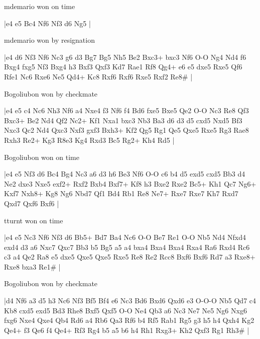 mdemario won on time

\makegametitle
|e4 e5 Bc4 Nf6 Nf3 d6 Ng5  |

\showboard

mdemario won by resignation

\makegametitle
|e4 d6 Nf3 Nf6 Nc3 g6 d3 Bg7 Bg5 Nh5 Be2 Bxc3+ bxc3 Nf6 O-O Ng4 Nd4 f6 Bxg4 fxg5 Nf3 Bxg4 h3 Bxf3 Qxf3 Kd7 Rae1 Rf8 Qg4+ e6 e5 dxe5 Rxe5 Qf6 Rfe1 Nc6 Rxe6 Ne5 Qd4+ Kc8 Rxf6 Rxf6 Rxe5 Rxf2 Re8\#  |

\showboard

Bogoliubon won by checkmate

\makegametitle
|e4 e5 c4 Nc6 Nh3 Nf6 a4 Nxe4 f3 Nf6 f4 Bd6 fxe5 Bxe5 Qe2 O-O Nc3 Re8 Qf3 Bxc3+ Be2 Nd4 Qf2 Nc2+ Kf1 Nxa1 bxc3 Nb3 Ba3 d6 d3 d5 cxd5 Nxd5 Bf3 Nxc3 Qc2 Nd4 Qxc3 Nxf3 gxf3 Bxh3+ Kf2 Qg5 Rg1 Qe5 Qxe5 Rxe5 Rg3 Rae8 Rxh3 Re2+ Kg3 R8e3 Kg4 Rxd3 Bc5 Rg2+ Kh4 Rd5  |

\showboard

Bogoliubon won on time

\makegametitle
|e4 e5 Nf3 d6 Bc4 Bg4 Nc3 a6 d3 h6 Be3 Nf6 O-O c6 b4 d5 exd5 cxd5 Bb3 d4 Ne2 dxe3 Nxe5 exf2+ Rxf2 Bxb4 Bxf7+ Kf8 h3 Bxe2 Rxe2 Bc5+ Kh1 Qc7 Ng6+ Kxf7 Nxh8+ Kg8 Ng6 Nbd7 Qf1 Bd4 Rb1 Re8 Ne7+ Rxe7 Rxe7 Kh7 Rxd7 Qxd7 Qxf6 Bxf6  |

\showboard

tturnt won on time

\makegametitle
|e4 e5 Nc3 Nf6 Nf3 d6 Bb5+ Bd7 Ba4 Nc6 O-O Be7 Re1 O-O Nb5 Nd4 Nfxd4 exd4 d3 a6 Nxc7 Qxc7 Bb3 b5 Bg5 a5 a4 bxa4 Bxa4 Bxa4 Rxa4 Ra6 Rxd4 Rc6 c3 a4 Qe2 Ra8 e5 dxe5 Qxe5 Qxe5 Rxe5 Re8 Re2 Rcc8 Bxf6 Bxf6 Rd7 a3 Rxe8+ Rxe8 bxa3 Re1\#  |

\showboard

Bogoliubon won by checkmate

\makegametitle
|d4 Nf6 a3 d5 h3 Nc6 Nf3 Bf5 Bf4 e6 Nc3 Bd6 Bxd6 Qxd6 e3 O-O-O Nb5 Qd7 c4 Kb8 cxd5 exd5 Bd3 Rhe8 Bxf5 Qxf5 O-O Ne4 Qb3 a6 Nc3 Ne7 Ne5 Ng6 Nxg6 fxg6 Nxe4 Qxe4 Qb4 Rd6 a4 Rb6 Qa3 Rf6 b4 Rf5 Rab1 Rg5 g3 h5 h4 Qxh4 Kg2 Qe4+ f3 Qe6 f4 Qe4+ Rf3 Rg4 b5 a5 b6 h4 Rh1 Rxg3+ Kh2 Qxf3 Rg1 Rh3\#  |

